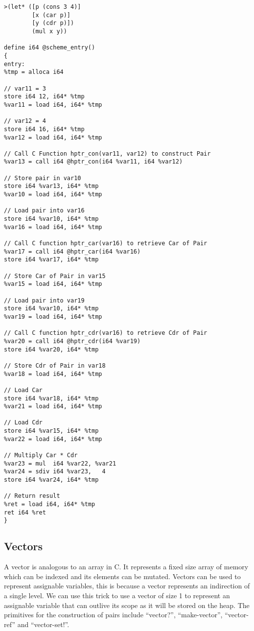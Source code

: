 \documentclass{article}
\begin{document}
\begingroup
    \fontsize{8pt}{5pt}\selectfont
\begin{verbatim}
>(let* ([p (cons 3 4)]
        [x (car p)]
        [y (cdr p)])
        (mul x y))

define i64 @scheme_entry()
{
entry: 
%tmp = alloca i64

// var11 = 3
store i64 12, i64* %tmp
%var11 = load i64, i64* %tmp     

// var12 = 4
store i64 16, i64* %tmp
%var12 = load i64, i64* %tmp

// Call C Function hptr_con(var11, var12) to construct Pair
%var13 = call i64 @hptr_con(i64 %var11, i64 %var12) 

// Store pair in var10
store i64 %var13, i64* %tmp
%var10 = load i64, i64* %tmp

// Load pair into var16
store i64 %var10, i64* %tmp
%var16 = load i64, i64* %tmp

// Call C function hptr_car(var16) to retrieve Car of Pair
%var17 = call i64 @hptr_car(i64 %var16)
store i64 %var17, i64* %tmp

// Store Car of Pair in var15
%var15 = load i64, i64* %tmp

// Load pair into var19
store i64 %var10, i64* %tmp
%var19 = load i64, i64* %tmp

// Call C function hptr_cdr(var16) to retrieve Cdr of Pair
%var20 = call i64 @hptr_cdr(i64 %var19)
store i64 %var20, i64* %tmp

// Store Cdr of Pair in var18
%var18 = load i64, i64* %tmp

// Load Car
store i64 %var18, i64* %tmp
%var21 = load i64, i64* %tmp

// Load Cdr
store i64 %var15, i64* %tmp
%var22 = load i64, i64* %tmp

// Multiply Car * Cdr 
%var23 = mul  i64 %var22, %var21
%var24 = sdiv i64 %var23,   4
store i64 %var24, i64* %tmp

// Return result
%ret = load i64, i64* %tmp
ret i64 %ret
}
\end{verbatim}
\endgroup

\subsection{Vectors}

A vector is analogous to an array in C. It represents a fixed size array of memory which can be indexed and its elements can be mutated. Vectors can be used to represent assignable variables, this is because a vector represents an indirection of a single level. We can use this trick to use a vector of size 1 to represent an assignable variable that can outlive its scope as it will be stored on the heap. The primitives for the construction of pairs include ``vector?'', ``make-vector'', ``vector-ref'' and ``vector-set!''.  
\end{document}
